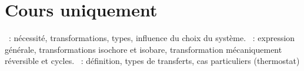 \documentclass[a4paper, 10pt, final, garamond]{book}
\begin{document}
\section{Cours uniquement}
\begin{enumerate}[label=\Roman*]
	~: nécessité, transformations, types, influence du choix
	du système.
	~: expression générale, transformations
	isochore et isobare, transformation mécaniquement réversible et cycles.
	~: définition, types de transferts, cas
	particuliers (thermostat)
\end{enumerate}

\newpage
\end{document}
